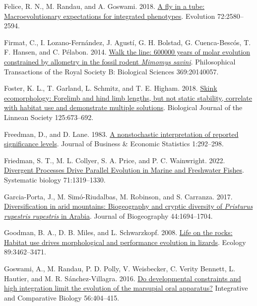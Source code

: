 \documentclass[
  11pt,
]{article}
\newlength{\cslhangindent}
\newlength{\cslentryspacingunit} %
\newenvironment{CSLReferences}[2] %
 {%
  \setlength{\parindent}{0pt}
  \ifodd #1
  \let\oldpar\par
  \def\par{\hangindent=\cslhangindent\oldpar}
  \fi
  \setlength{\parskip}{#2\cslentryspacingunit}
 }%
 {}
\begin{document}
\begin{CSLReferences}{1}{0}
\leavevmode{}%
Felice, R. N., M. Randau, and A. Goswami. 2018.
\href{https://doi.org/10.1111/evo.13608}{A fly in a tube:
Macroevolutionary expectations for integrated phenotypes}. Evolution
72:2580--2594.

\leavevmode{}%
Firmat, C., I. Lozano-Fernández, J. Agustí, G. H. Bolstad, G.
Cuenca-Bescós, T. F. Hansen, and C. Pélabon. 2014.
\href{https://doi.org/10.1098/rstb.2014.0057}{Walk the line: 600000
years of molar evolution constrained by allometry in the fossil rodent
\emph{{M}imomys savini}}. Philosophical Transactions of the Royal
Society B: Biological Sciences 369:20140057.

\leavevmode{}%
Foster, K. L., T. Garland, L. Schmitz, and T. E. Higham. 2018.
\href{https://doi.org/10.1093/biolinnean/bly146}{{Skink ecomorphology:
Forelimb and hind limb lengths, but not static stability, correlate with
habitat use and demonstrate multiple solutions}}. Biological Journal of
the Linnean Society 125:673--692.

\leavevmode{}%
Freedman, D., and D. Lane. 1983.
\href{https://doi.org/10.2307/1391660}{A nonstochastic interpretation of
reported significance levels}. Journal of Business {\&} Economic
Statistics 1:292--298.

\leavevmode{}%
Friedman, S. T., M. L. Collyer, S. A. Price, and P. C. Wainwright. 2022.
\href{https://doi.org/10.1093/sysbio/syab080}{{Divergent Processes Drive
Parallel Evolution in Marine and Freshwater Fishes}}. Systematic biology
71:1319--1330.

\leavevmode{}%
Garcia-Porta, J., M. Simó-Riudalbas, M. Robinson, and S. Carranza. 2017.
\href{https://doi.org/10.1111/jbi.12929}{Diversification in arid
mountains: Biogeography and cryptic diversity of \emph{{P}risturus
rupestris rupestris} in {A}rabia}. Journal of Biogeography
44:1694--1704.

\leavevmode{}%
Goodman, B. A., D. B. Miles, and L. Schwarzkopf. 2008.
\href{https://doi.org/10.1890/07-2093.1}{{Life on the rocks: Habitat use
drives morphological and performance evolution in lizards}}. Ecology
89:3462--3471.

\leavevmode{}%
Goswami, A., M. Randau, P. D. Polly, V. Weisbecker, C. Verity Bennett,
L. Hautier, and M. R. Sánchez-Villagra. 2016.
\href{https://doi.org/10.1093/icb/icw039}{Do developmental constraints
and high integration limit the evolution of the marsupial oral
apparatus?} Integrative and Comparative Biology 56:404--415.


\end{CSLReferences}
\end{document}
